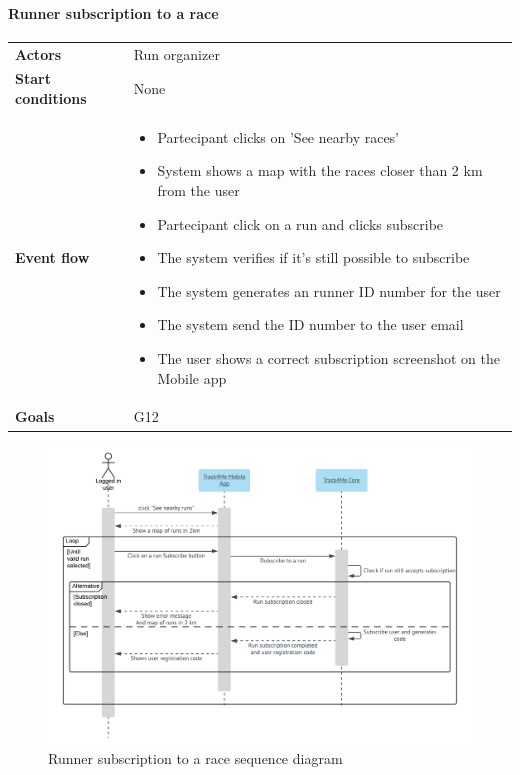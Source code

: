 \paragraph{Runner subscription to a race}
\begin{center}
\begin{table}[H]
\centering
\begin{tabular}{l|p{}}
\textbf{Actors} & Run organizer\\
\textbf{Start conditions} & None \\
\textbf{Event flow}  & \begin{minipage}[t]{0.7\textwidth}
    \begin{itemize}
       \item Partecipant clicks on 'See nearby races'

        \item System shows a map with the races closer than 2 km from the user

\item Partecipant click on a run and clicks subscribe
\item The system verifies if it's still possible to subscribe

\item The system generates an runner ID number for the user
\item The system send the ID number to the user email
\item The user shows a correct subscription screenshot on the Mobile app

    \end{itemize}
    \end{minipage}
    \\
\textbf{Goals} & G12
\end{tabular}

\end{table}
\end{center}

\begin{figure}[H]
  \includegraphics[width=\textwidth,height=\textheight,keepaspectratio]{assets/sequence/RunnerSubscriptionToARace.pdf}
  \caption{Runner subscription to a race sequence diagram}
  \label{fig:RunnerSubscriptionToARace}
\end{figure}







